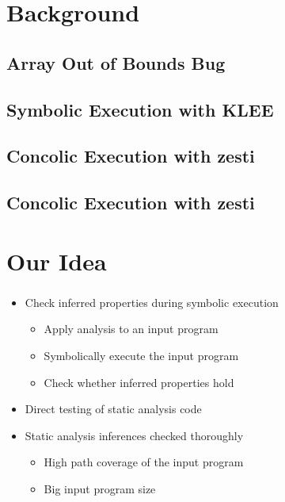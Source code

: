 \documentclass[mathserif,10pt]{beamer}
\begin{document}
\section{Background}
\subsection{Array Out of Bounds Bug}
\frame
{
  \frametitle{\subsecname}
  \lstBugI
}

\subsection{Symbolic Execution with KLEE}
\frame
{
  \frametitle{\subsecname}
  \lstBugII
}

\subsection{Concolic Execution with zesti}
\frame
{
  \frametitle{\subsecname}
  \lstBugIII
}

\subsection{Concolic Execution with zesti}
\frame
{
  \frametitle{\subsecname}
  \lstBugIV
}

\section{Our Idea}
\frame
{
  \frametitle{\secname}
  \begin{itemize} [<+->]
    \item Check inferred properties during symbolic execution
    \begin{itemize}
      \item Apply analysis to an input program
      \item Symbolically execute the input program
      \item Check whether inferred properties hold
    \end{itemize} 
    \vspace{1cm}
    \item Direct testing of static analysis code
    \vspace{1cm}
    \item Static analysis inferences checked thoroughly
    \begin{itemize}
      \item High path coverage of the input program
      \item Big input program size
    \end{itemize} 
  \end{itemize} 
}
\end{document}
